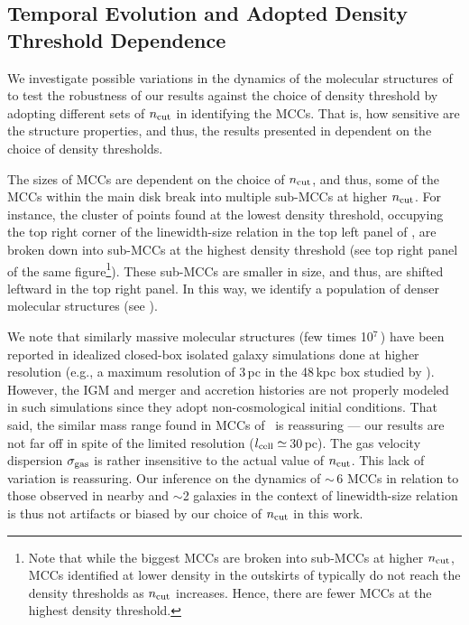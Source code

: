 \IfFileExists{emulateapjlegacy.cls}{\documentclass[iop]{emulateapjlegacy}}{\documentclass[iop]{emulateapj}}
\begin{document}
\subsection{Temporal Evolution and Adopted Density Threshold Dependence}\label{sec:ncut}

We investigate possible variations in the dynamics of the molecular structures of \flower to test the robustness of our results against the
choice of density threshold by adopting different sets of $n_{\rm cut}$ in identifying the MCCs. That is, how sensitive are the structure properties, and thus,
the results presented in  dependent on the choice of density thresholds.

The sizes of MCCs are dependent on the choice of $n_{\rm cut}$,
and thus, some of the MCCs within the main disk break into multiple sub-MCCs at higher $n_{\rm cut}$.
For instance, the cluster of points found at the lowest density threshold,
occupying the top right corner of the linewidth-size relation in the top left panel of ,
are broken down into sub-MCCs at the highest density threshold (see top right panel of the same figure\footnote{Note
that while the biggest MCCs are broken into sub-MCCs at higher $n_{\rm cut}$, MCCs identified at lower density in the outskirts of \flower
typically do not reach the density thresholds as $n_{\rm cut}$ increases. Hence, there are fewer MCCs at the highest density threshold.}).
These sub-MCCs are smaller in size, and thus, are shifted leftward in the top right panel.
In this way, we identify a population of denser molecular structures (see ).

We note that similarly massive molecular structures (few times 10$^7$\,\Msun) have been
reported in idealized closed-box isolated galaxy simulations done at higher resolution (e.g., a maximum
resolution of 3\,pc in the 48\,kpc box studied by \citealt{Behrendt16a}).
However, the IGM and merger and accretion histories are not properly modeled in such simulations since
they adopt non-cosmological initial conditions. That said, the similar mass range found in MCCs of \flower\ is
reassuring --- our results are not far off in spite of the limited resolution ($l_{\rm cell}\simeq$\,30\,pc).
The gas velocity dispersion $\sigma_{\rm gas}$ is rather insensitive to the actual value of $n_{\rm cut}$.
This lack of variation is reassuring. Our inference on the dynamics of \z$\sim$\,6 MCCs in relation to those observed in
nearby and \z$\sim$2 galaxies in the context of linewidth-size relation is thus not artifacts or biased by our choice of $n_{\rm cut}$ in this work.
\end{document}
